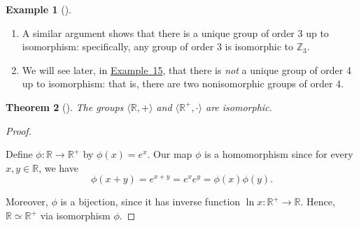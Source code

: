 \documentclass[10pt,openany,oneside]{book}
\theoremstyle{plain}
\newtheorem{theorem}{Theorem}[section]
\theoremstyle{definition}
\theoremstyle{definition}
\theoremstyle{definition}
\newtheorem{example}[theorem]{Example}
\theoremstyle{definition}
\numberwithin{equation}{section}
\newlength{\panelmax}
\def\Z{\mathbb{Z}}
\def\R{\mathbb{R}}
\begin{document}
\begin{example}[]
\begin{enumerate}
{%
\par\medskip\noindent
\begin{tabular}{@{}*{2}{c}@{}}
\begin{minipage}[c][\panelmax][t]{0.5\linewidth}\usebox{\panelboxItabular}\end{minipage}&
\begin{minipage}[c][\panelmax][t]{0.5\linewidth}\usebox{\panelboxJtabular}\end{minipage}\end{tabular}\\
}%
\par
Note that the first table looks exactly like the second table if we replace \(*\) with \(+\), each \(e\) with \(0\), and each \(a\) with \(1\). This shows that groups \(G\) and \(\Z_2\) have identical structures; more precisely, it shows that the function \(\phi\) from \(G\) to \(\Z_2\) defined by \(\phi(e)=0\) and \(\phi(a)=1\) is an isomorphism.  Since any group of order 2 is isomorphic to \(\Z_2\), using \hyperref[groupisoequiv]{Theorem~3} we see that there is a unique group of order 2, up to isomorphism.%
\item\hypertarget{li-153}{}A similar argument shows that there is a unique group of order 3 up to isomorphism: specifically, any group of order 3 is isomorphic to \(\Z_3\).%
\item\hypertarget{li-154}{}We will see later, in \hyperref[x4nonunique]{Example~15}, that there is \emph{not} a unique group of order 4 up to isomorphism: that is, there are two nonisomorphic groups of order 4.%
\end{enumerate}
%
\end{example}
\begin{theorem}[{}]\label{theorem-17}
The groups \(\langle \R,+\rangle\) and \(\langle \R^+, \cdot\rangle\) are isomorphic.%
\end{theorem}
\begin{proof}\hypertarget{proof-15}{}
Define \(\phi:\R\to \R^+\) by \(\phi(x)=e^x\). Our map \(\phi\) is a homomorphism since for every \(x,y\in \R\), we have%
\begin{equation*}
\phi(x+y)=e^{x+y}=e^xe^y=\phi(x)\phi(y).
\end{equation*}
%
\par
Moreover, \(\phi\) is a bijection, since it has inverse function \(\ln x: \R^+\to \R\). Hence, \(\R \simeq \R^+\) via isomorphism \(\phi\).%
\end{proof}
\end{document}

